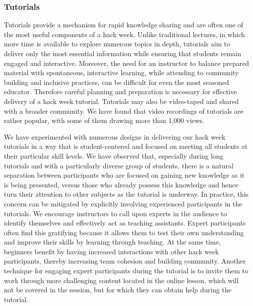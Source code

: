 \documentclass{aastex62}
\begin{document}
\subsubsection{Tutorials}
Tutorials provide a mechanism for rapid knowledge sharing and are often one of the most useful components of a hack week. Unlike traditional lectures, in which more time is available to explore numerous topics in depth, tutorials aim to deliver only the most essential information while ensuring that students remain engaged and interactive. Moreover, the need for an instructor to balance prepared material with spontaneous, interactive learning, while attending to community building and inclusive practices, can be difficult for even the most seasoned educator. Therefore careful planning and preparation is necessary for effective delivery of a hack week tutorial. Tutorials may also be video-taped and shared with a broader community. We have found that video recordings of tutorials are rather popular, with some of them drawing more than 1,000 views.

We have experimented with numerous designs in delivering our hack week tutorials in a way that is student-centered and focused on meeting all students at their particular skill levels. We have observed that, especially during long tutorials and with a particularly diverse group of students, there is a natural separation between participants who are focused on gaining new knowledge as it is being presented, versus those who already possess this knowledge and hence turn their attention to other subjects as the tutorial is underway. In practice, this concern can be mitigated by explicitly involving experienced participants in the tutorials. We encourage instructors to call upon experts in the audience to identify themselves and effectively act as teaching assistants. Expert participants often find this gratifying because it allows them to test their own understanding and improve their skills by learning through teaching. At the same time, beginners benefit by having increased interactions with other hack week participants, thereby increasing team cohesion and building community. Another technique for engaging expert participants during the tutorial is to invite them to work through more challenging content located in the online lesson, which will not be covered in the session, but for which they can obtain help during the tutorial.
\end{document}
